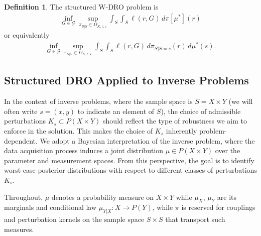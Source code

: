 \documentclass{article}
\newcommand{\Okc}{\Omega_{K, c, \varepsilon}}
\theoremstyle{definition}
\newtheorem{definition}{Definition}[section]
\theoremstyle{remarksty}
\begin{document}
\begin{definition}\label{def:padro}
    The structured W-DRO problem is 
    \begin{align*}
        \inf_{G \in \mathcal{G}} \sup_{\pi_{S|S} \in \Okc} \int_S\int_S \ell(r,G)\,d\pi[\mu^*](r) 
      \end{align*}
      or equivalently
\begin{align}\label{eq:d-padro}
        \inf_{G \in \mathcal{G}} \sup_{\pi_{S|S} \in \Okc} \int_S\int_S \ell(r,G)\,d\pi_{S|S=s}(r)\,d\mu^*(s).
    \end{align}
\end{definition}

\subsection{Structured DRO Applied to Inverse Problems}\label{sec:str}
In the context of inverse problems, where the sample space is $S = X\times Y$ (we will often write $s = (x,y)$ to indicate an element of $S$), the choice of admissible perturbations $K_s \subset P(X \times Y)$ should reflect the type of robustness we aim to enforce in the solution. This makes the choice of $K_s$ inherently problem-dependent. We adopt a Bayesian interpretation of the inverse problem, where the data acquisition process induces a joint distribution $\mu \in P(X \times Y)$ over the parameter and measurement spaces. From this perspective, the goal is to identify worst-case posterior distributions with respect to different classes of perturbations $K_s$. 

Throughout, $\mu$ denotes a probability measure on $X\times Y$ while $\mu_X$, $\mu_Y$ are its marginals and conditional law $\mu_{Y|X}: X \to P(Y)$, while $\pi$ is reserved for couplings and perturbation kernels on the sample space $S\times S$ that transport such measures. 
\end{document}
